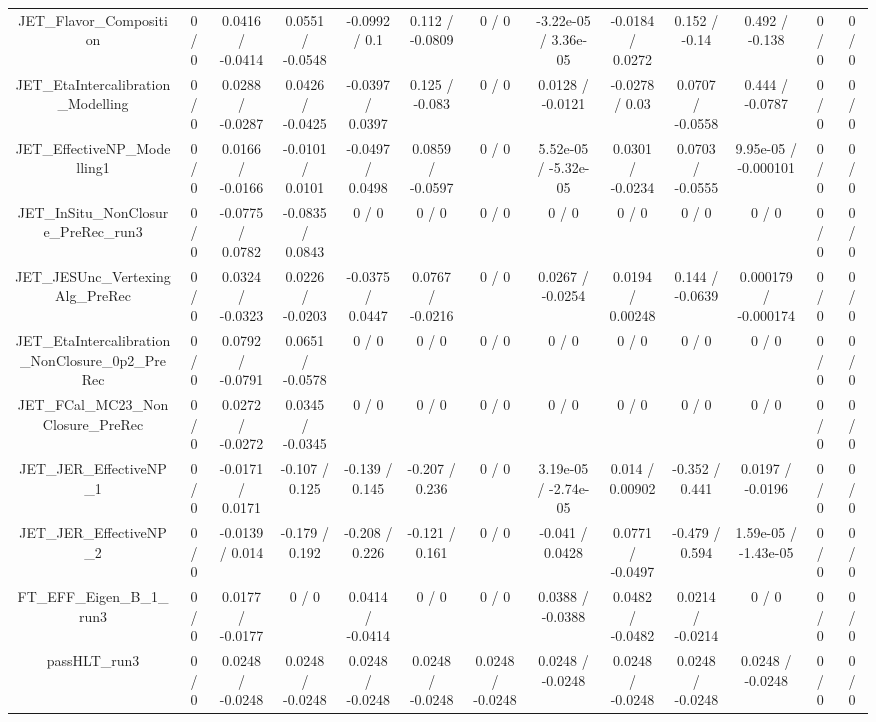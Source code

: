 \documentclass[10pt]{article}
\begin{document}
\begin{table}[htbp]
\begin{center}
\begin{tabular}{|c|c|c|c|c|c|c|c|c|c|c|c|c|}
  JET_Flavor_Composition & 0 / 0 & 0.0416 / -0.0414 & 0.0551 / -0.0548 & -0.0992 / 0.1 & 0.112 / -0.0809 & 0 / 0 & -3.22e-05 / 3.36e-05 & -0.0184 / 0.0272 & 0.152 / -0.14 & 0.492 / -0.138 & 0 / 0 & 0 / 0 \\ 
  JET_EtaIntercalibration_Modelling & 0 / 0 & 0.0288 / -0.0287 & 0.0426 / -0.0425 & -0.0397 / 0.0397 & 0.125 / -0.083 & 0 / 0 & 0.0128 / -0.0121 & -0.0278 / 0.03 & 0.0707 / -0.0558 & 0.444 / -0.0787 & 0 / 0 & 0 / 0 \\ 
  JET_EffectiveNP_Modelling1 & 0 / 0 & 0.0166 / -0.0166 & -0.0101 / 0.0101 & -0.0497 / 0.0498 & 0.0859 / -0.0597 & 0 / 0 & 5.52e-05 / -5.32e-05 & 0.0301 / -0.0234 & 0.0703 / -0.0555 & 9.95e-05 / -0.000101 & 0 / 0 & 0 / 0 \\ 
  JET_InSitu_NonClosure_PreRec_run3 & 0 / 0 & -0.0775 / 0.0782 & -0.0835 / 0.0843 & 0 / 0 & 0 / 0 & 0 / 0 & 0 / 0 & 0 / 0 & 0 / 0 & 0 / 0 & 0 / 0 & 0 / 0 \\ 
  JET_JESUnc_VertexingAlg_PreRec & 0 / 0 & 0.0324 / -0.0323 & 0.0226 / -0.0203 & -0.0375 / 0.0447 & 0.0767 / -0.0216 & 0 / 0 & 0.0267 / -0.0254 & 0.0194 / 0.00248 & 0.144 / -0.0639 & 0.000179 / -0.000174 & 0 / 0 & 0 / 0 \\ 
  JET_EtaIntercalibration_NonClosure_0p2_PreRec & 0 / 0 & 0.0792 / -0.0791 & 0.0651 / -0.0578 & 0 / 0 & 0 / 0 & 0 / 0 & 0 / 0 & 0 / 0 & 0 / 0 & 0 / 0 & 0 / 0 & 0 / 0 \\ 
  JET_FCal_MC23_NonClosure_PreRec & 0 / 0 & 0.0272 / -0.0272 & 0.0345 / -0.0345 & 0 / 0 & 0 / 0 & 0 / 0 & 0 / 0 & 0 / 0 & 0 / 0 & 0 / 0 & 0 / 0 & 0 / 0 \\ 
  JET_JER_EffectiveNP_1 & 0 / 0 & -0.0171 / 0.0171 & -0.107 / 0.125 & -0.139 / 0.145 & -0.207 / 0.236 & 0 / 0 & 3.19e-05 / -2.74e-05 & 0.014 / 0.00902 & -0.352 / 0.441 & 0.0197 / -0.0196 & 0 / 0 & 0 / 0 \\ 
  JET_JER_EffectiveNP_2 & 0 / 0 & -0.0139 / 0.014 & -0.179 / 0.192 & -0.208 / 0.226 & -0.121 / 0.161 & 0 / 0 & -0.041 / 0.0428 & 0.0771 / -0.0497 & -0.479 / 0.594 & 1.59e-05 / -1.43e-05 & 0 / 0 & 0 / 0 \\ 
  FT_EFF_Eigen_B_1_run3 & 0 / 0 & 0.0177 / -0.0177 & 0 / 0 & 0.0414 / -0.0414 & 0 / 0 & 0 / 0 & 0.0388 / -0.0388 & 0.0482 / -0.0482 & 0.0214 / -0.0214 & 0 / 0 & 0 / 0 & 0 / 0 \\ 
  passHLT_run3 & 0 / 0 & 0.0248 / -0.0248 & 0.0248 / -0.0248 & 0.0248 / -0.0248 & 0.0248 / -0.0248 & 0.0248 / -0.0248 & 0.0248 / -0.0248 & 0.0248 / -0.0248 & 0.0248 / -0.0248 & 0.0248 / -0.0248 & 0 / 0 & 0 / 0 \\ 

\end{tabular}
\end{center}
\end{table}
\end{document}
